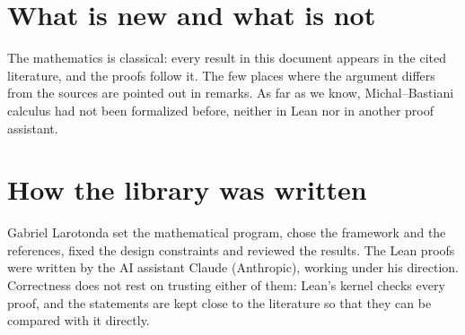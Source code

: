\section*{What is new and what is not}

The mathematics is classical: every result in this document appears in the cited literature,
and the proofs follow it. The few places where the argument differs from the sources are
pointed out in remarks. As far as we know, Michal--Bastiani calculus had not been formalized
before, neither in Lean nor in another proof assistant.

\section*{How the library was written}

Gabriel Larotonda set the mathematical program, chose the framework and the references, fixed
the design constraints and reviewed the results. The Lean proofs were written by the AI
assistant Claude (Anthropic), working under his direction. Correctness does not rest on trusting
either of them: Lean's kernel checks every proof, and the statements are kept close to the
literature so that they can be compared with it directly.
